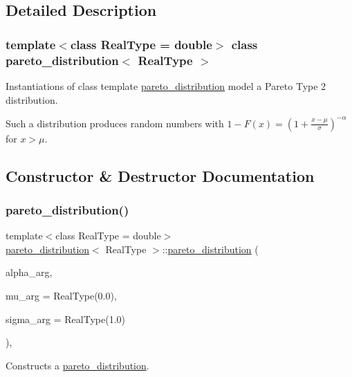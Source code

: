 \subsection{Detailed Description}
\subsubsection*{template$<$class Real\+Type = double$>$\newline
class pareto\+\_\+distribution$<$ Real\+Type $>$}

Instantiations of class template \mbox{\hyperlink{classpareto__distribution}{pareto\+\_\+distribution}} model a Pareto Type 2 distribution. 

Such a distribution produces random numbers with $\displaystyle 1-F(x) = (1+\frac{x-\mu}{\sigma})^{-\alpha}$ for $ x > \mu $. 

\subsection{Constructor \& Destructor Documentation}
\mbox{\label{classpareto__distribution_a667f195859ce355378510b79c2a6e6ee}} 
\subsubsection{\texorpdfstring{pareto\+\_\+distribution()}{pareto\_distribution()}}
{\footnotesize\ttfamily template$<$class Real\+Type  = double$>$ \\
\mbox{\hyperlink{classpareto__distribution}{pareto\+\_\+distribution}}$<$ Real\+Type $>$\+::\mbox{\hyperlink{classpareto__distribution}{pareto\+\_\+distribution}} (\begin{DoxyParamCaption}\item[{Real\+Type}]{alpha\+\_\+arg,  }\item[{Real\+Type}]{mu\+\_\+arg = {\ttfamily RealType(0.0)},  }\item[{Real\+Type}]{sigma\+\_\+arg = {\ttfamily RealType(1.0)} }\end{DoxyParamCaption})\hspace{0.3cm}{\ttfamily [inline]}, {\ttfamily [explicit]}}



Constructs a \mbox{\hyperlink{classpareto__distribution}{pareto\+\_\+distribution}}. 

